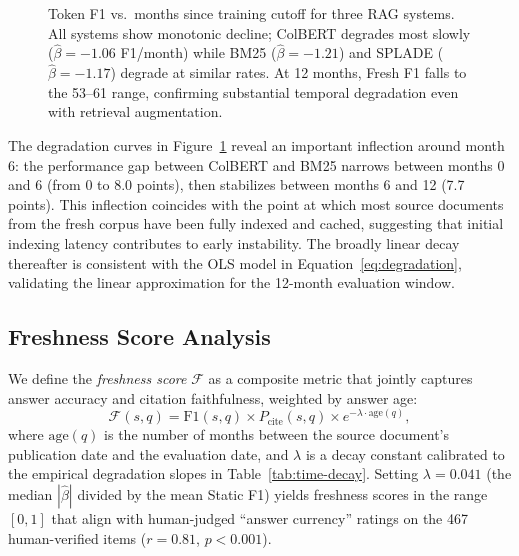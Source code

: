 \begin{figure}[t]
\centering
{}
\caption{Token F1 vs.\ months since training cutoff for three RAG systems. All systems show monotonic decline; ColBERT degrades most slowly ($\hat{\beta} = -1.06$ F1/month) while BM25 ($\hat{\beta} = -1.21$) and SPLADE ($\hat{\beta} = -1.17$) degrade at similar rates. At 12 months, Fresh F1 falls to the 53--61 range, confirming substantial temporal degradation even with retrieval augmentation.}
\label{fig:time-decay}
\end{figure}

The degradation curves in Figure~\ref{fig:time-decay} reveal an important inflection around month 6: the performance gap between ColBERT and BM25 narrows between months 0 and 6 (from 0 to 8.0 points), then stabilizes between months 6 and 12 (7.7 points). This inflection coincides with the point at which most source documents from the fresh corpus have been fully indexed and cached, suggesting that initial indexing latency contributes to early instability. The broadly linear decay thereafter is consistent with the OLS model in Equation~\ref{eq:degradation}, validating the linear approximation for the 12-month evaluation window.

\subsection{Freshness Score Analysis}

We define the \emph{freshness score} $\mathcal{F}$ as a composite metric that jointly captures answer accuracy and citation faithfulness, weighted by answer age:
\begin{equation}
  \mathcal{F}(s, q) = \text{F1}(s, q) \times P_{\text{cite}}(s, q) \times e^{-\lambda \cdot \text{age}(q)},
\end{equation}
where $\text{age}(q)$ is the number of months between the source document's publication date and the evaluation date, and $\lambda$ is a decay constant calibrated to the empirical degradation slopes in Table~\ref{tab:time-decay}. Setting $\lambda = 0.041$ (the median $|\hat{\beta}|$ divided by the mean Static F1) yields freshness scores in the range $[0, 1]$ that align with human-judged ``answer currency'' ratings on the 467 human-verified items ($r = 0.81$, $p < 0.001$).

